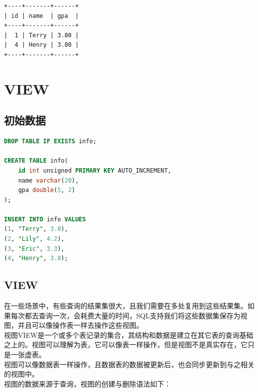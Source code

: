 \documentclass[12pt, openany, oneside]{book}
\begin{document}
\begin{tcolorbox}
\begin{verbatim}
+----+-------+------+
| id | name  | gpa  |
+----+-------+------+
|  1 | Terry | 3.80 |
|  4 | Henry | 3.80 |
+----+-------+------+
	\end{verbatim}
\end{tcolorbox}

\newpage

\chapter{VIEW}

\section{初始数据}


\begin{lstlisting}[language=SQL]
DROP TABLE IF EXISTS info;

CREATE TABLE info(
    id int unsigned PRIMARY KEY AUTO_INCREMENT,
    name varchar(20),
    gpa double(5, 2)
);

INSERT INTO info VALUES
(1, "Terry", 3.8),
(2, "Lily", 4.2),
(3, "Eric", 3.3),
(4, "Henry", 3.8);
\end{lstlisting}

\vspace{0.5cm}

\section{VIEW}

在一些场景中，有些查询的结果集很大，且我们需要在多处复用到这些结果集。如果每次都去查询一次，会耗费大量的时间，SQL支持我们将这些数据集保存为视图，并且可以像操作表一样去操作这些视图。\\

视图VIEW是一个或多个表记录的集合，其结构和数据是建立在其它表的查询基础之上的。视图可以理解为表，它可以像表一样操作，但是视图不是真实存在，它只是一张虚表。\\

视图可以像数据表一样操作，且数据表的数据被更新后，也会同步更新到与之相关的视图中。\\

视图的数据来源于查询，视图的创建与删除语法如下：

\vspace{-0.5cm}
\end{document}
